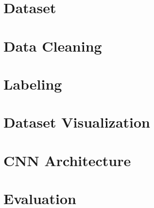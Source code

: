 \documentclass{report}
\begin{document}
  

  \tableofcontents{}
  \printindex{}

  \chapter{Dataset}
  

  \chapter{Data Cleaning}
    

  \chapter{Labeling}
    

  \chapter{Dataset Visualization}
  

  \chapter{CNN Architecture}
    

  \chapter{Evaluation}
    


  
  
  \printindex
\end{document}
